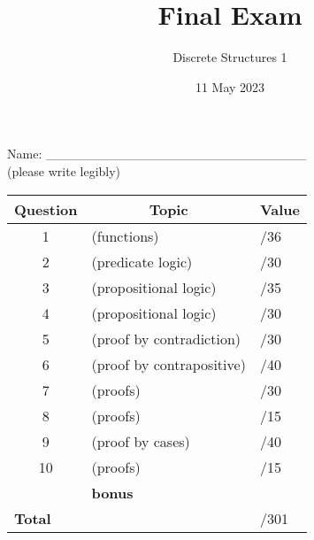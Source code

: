 \documentclass[11pt, oneside]{article}   	%
\title{Final Exam}
\author{Discrete Structures 1}
\date{11 May 2023}							%
\begin{document}
\maketitle
\begin{center}
Name: \_\_\_\_\_\_\_\_\_\_\_\_\_\_\_\_\_\_\_\_\_\_\_\_\_\_\_\_ \\(please write legibly) 
\end{center}

\begin{center}
\begin{tabular}{|c|l|l|}
\hline
\textbf{Question} & \multicolumn{1}{|c|}{\textbf{Topic}} & \multicolumn{1}{|c|}{\textbf{Value}}\\
\hline
\hline
1 & (functions) & \hspace{3em}/36\\ \hline
2 & (predicate logic) & \hspace{3em}/30\\ \hline
3 & (propositional logic) & \hspace{3em}/35\\ \hline
4 & (propositional logic) & \hspace{3em}/30\\ \hline
5 & (proof by contradiction) & \hspace{3em}/30\\ \hline
6 & (proof by contrapositive) & \hspace{3em}/40\\ \hline
7 & (proofs) & \hspace{3em}/30\\ \hline
8 & (proofs) &  \hspace{3em}/15\\ \hline
9 & (proof by cases) & \hspace{3em}/40\\ \hline
10 & (proofs) & \hspace{3em}/15\\ \hline
 & \textbf{bonus} &\\ \hline
 \hline
\hline
\multicolumn{2}{|l|}{\textbf{Total}} & \hspace{4em}/301\\
\hline
\end{tabular}
\end{center}
\end{document}
